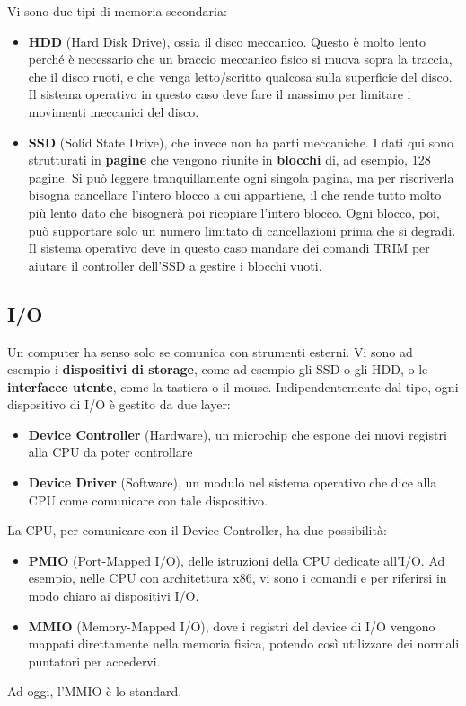 \documentclass[11pt, a4paper, titlepage, oneside]{scrbook}
\begin{document}
Vi sono due tipi di memoria secondaria:
\begin{itemize}
    \item \textbf{HDD} (Hard Disk Drive), ossia il disco meccanico. Questo è molto lento perché è necessario che un braccio meccanico fisico si muova sopra la traccia, che il disco ruoti, e che venga letto/scritto qualcosa sulla superficie del disco. Il sistema operativo in questo caso deve fare il massimo per limitare i movimenti meccanici del disco.
    \item \textbf{SSD} (Solid State Drive), che invece non ha parti meccaniche. I dati qui sono strutturati in \textbf{pagine} che vengono riunite in \textbf{blocchi} di, ad esempio, 128 pagine. Si può leggere tranquillamente ogni singola pagina, ma per riscriverla bisogna cancellare l'intero blocco a cui appartiene, il che rende tutto molto più lento dato che bisognerà poi ricopiare l'intero blocco. Ogni blocco, poi, può supportare solo un numero limitato di cancellazioni prima che si degradi. Il sistema operativo deve in questo caso mandare dei comandi TRIM per aiutare il controller dell'SSD a gestire i blocchi vuoti.
\end{itemize}

\subsection{I/O}

Un computer ha senso solo se comunica con strumenti esterni. Vi sono ad esempio i \textbf{dispositivi di storage}, come ad esempio gli SSD o gli HDD, o le \textbf{interfacce utente}, come la tastiera o il mouse. Indipendentemente dal tipo, ogni dispositivo di I/O è gestito da due layer:
\begin{itemize}
    \item \textbf{Device Controller} (Hardware), un microchip che espone dei nuovi registri alla CPU da poter controllare
    \item \textbf{Device Driver} (Software), un modulo nel sistema operativo che dice alla CPU come comunicare con tale dispositivo.
\end{itemize}

La CPU, per comunicare con il Device Controller, ha due possibilità:
\begin{itemize}
    \item \textbf{PMIO} (Port-Mapped I/O), delle istruzioni della CPU dedicate all'I/O. Ad esempio, nelle CPU con architettura x86, vi sono i comandi  e  per riferirsi in modo chiaro ai dispositivi I/O.
    \item \textbf{MMIO} (Memory-Mapped I/O), dove i registri del device di I/O vengono mappati direttamente nella memoria fisica, potendo così utilizzare dei normali puntatori per accedervi.
\end{itemize}
Ad oggi, l'MMIO è lo standard.
\end{document}
